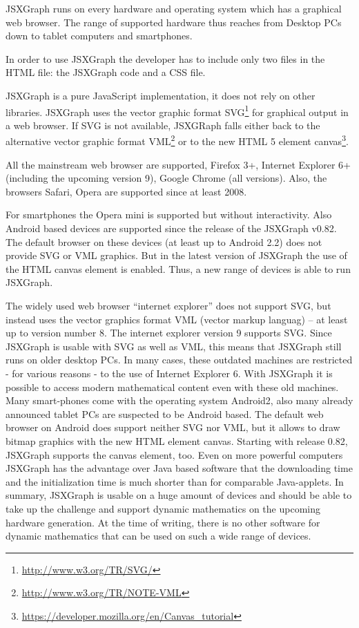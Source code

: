 \documentclass[12pt,a4paper]{article}%
\begin{document}
JSXGraph runs on every hardware and operating system which has a graphical 
web browser. The range of supported hardware thus reaches from Desktop PCs 
down to tablet computers and smartphones.

In order to use JSXGraph the developer has to include only two files in the 
HTML file: the JSXGraph code and a CSS file. 

JSXGraph is a pure JavaScript implementation, it does not rely on other 
libraries. JSXGraph uses the vector graphic format SVG\footnote{\href{http://www.w3.org/TR/SVG/}{http://www.w3.org/TR/SVG/}} 
for graphical output in a web browser. 
If SVG is not available, JSXGRaph falls either 
back to the alternative vector graphic format VML\footnote{\href{http://www.w3.org/TR/NOTE-VML}{http://www.w3.org/TR/NOTE-VML}} or 
to the new HTML 5 element canvas\footnote{\href{https://developer.mozilla.org/en/Canvas_tutorial}{https://developer.mozilla.org/en/Canvas\_tutorial}}.

All the mainstream web browser are supported, Firefox 3+, Internet Explorer
6+ (including the upcoming version 9), Google Chrome (all versions). 
Also, the browsers Safari, Opera are supported since at least 2008. 

For smartphones the Opera mini is supported but without interactivity.
Also Android based devices are supported since the release of the JSXGraph v0.82.
The default browser on these devices (at least up to Android 2.2) does not provide
SVG or VML graphics. But in the latest version of JSXGraph 
the use of the HTML canvas element is enabled. Thus, a new range of devices is 
able to run JSXGraph.


The widely used web browser “internet explorer” does not support SVG, but instead uses the vector graphics format VML (vector markup languag) – at least up to version number 8. The internet explorer version 9 supports SVG. Since JSXGraph is usable with SVG as well as VML, this means that JSXGraph still runs on older desktop PCs. In many cases, these outdated machines are restricted - for various reasons - to the use of  Internet Explorer 6. With  JSXGraph it is possible to access modern mathematical content even with these old machines.
Many smart-phones come with the operating system Android2, also many already announced tablet PCs are suspected to be Android based. The default web browser on Android does support neither SVG nor VML, but it allows to draw bitmap graphics with the new HTML element canvas. Starting with release 0.82, JSXGraph supports the canvas element, too. 
Even on more powerful computers JSXGraph has the advantage over Java based software that the downloading time and the initialization time is much shorter than for comparable Java-applets. 
In summary, JSXGraph is usable on a huge amount of devices and should be able to take up the challenge and support dynamic mathematics on the upcoming hardware generation.
At the time of writing, there is no other software for dynamic mathematics that can be used on such a wide range of devices.
\end{document}
